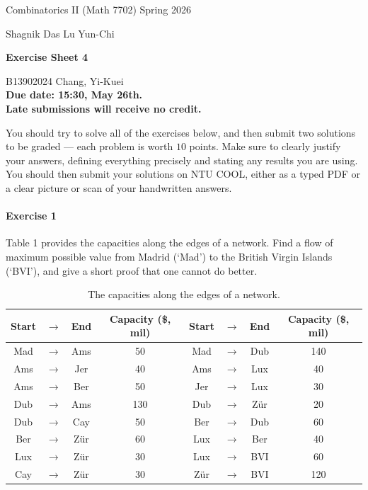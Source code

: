 \documentclass[a4paper,12pt]{article}
\newcommand{\courseTitle}{Combinatorics II (Math 7702)}
\newcommand{\semester}{Spring 2026}
\newcommand{\instructorA}{Shagnik Das}
\newcommand{\instructorB}{Lu Yun-Chi}
\newcommand{\sheetNumber}{4}
\newcommand{\dueDate}{15:30, May 26th.}
\newcommand{\lateWarning}{Late submissions will receive no credit.}
\newcommand{\buildtitle}[4]{
\begin{flushleft}
{\large
#1
\hfill{}
#2
\par
#3
}
\end{flushleft}
\vskip 4pt
\begin{center}
{\large\bfseries#4\par}
\end{center}
\bigskip
}
\begin{document}
\buildtitle{\courseTitle{}}{\semester}{\instructorA{} \hfill \instructorB{}}{Exercise Sheet \sheetNumber{}}

\vspace{-0.2in}

\begin{center}

{B13902024 Chang, Yi-Kuei \\ \bf Due date: \dueDate \\ \lateWarning}

\end{center}

\noindent You should try to solve all of the exercises below, and then submit two solutions to be graded --- each problem is worth $10$ points. Make sure to clearly justify your answers, defining everything precisely and stating any results you are using. You should then submit your solutions on NTU COOL, either as a typed PDF or a clear picture or scan of your handwritten answers.

\paragraph{Exercise 1}  Table 1 provides the capacities along the edges of a network. Find a flow of maximum possible value from Madrid (`Mad') to the British Virgin Islands (`BVI'), and give a short proof that one cannot do better.

\begin{table}[h!] \label{tab:capacities}
\center
\begin{tabular}{|ccc|c||ccc|c|}
	\hline
	Start & $\rightarrow$ & End & Capacity (\$, mil) & Start & $\rightarrow$ & End & Capacity (\$, mil) \\ \hline
	Mad & $\rightarrow$ & Ams & 50 & Mad & $\rightarrow$ & Dub & 140 \\ 
	Ams & $\rightarrow$ & Jer & 40 & Ams & $\rightarrow$ & Lux & 40 \\
	Ams & $\rightarrow$ & Ber & 50 & Jer & $\rightarrow$ & Lux & 30 \\
	Dub & $\rightarrow$ & Ams & 130 & Dub & $\rightarrow$ & Z\"ur & 20 \\
	Dub & $\rightarrow$ & Cay & 50 & Ber & $\rightarrow$ & Dub & 60 \\
	Ber & $\rightarrow$ & Z\"ur & 60 & Lux & $\rightarrow$ & Ber & 40 \\
	Lux & $\rightarrow$ & Z\"ur & 30 & Lux & $\rightarrow$ & BVI & 60 \\
	Cay & $\rightarrow$ & Z\"ur & 30 & Z\"ur & $\rightarrow$ & BVI & 120 \\ \hline
\end{tabular}
\caption{The capacities along the edges of a network.}
\end{table}
\end{document}
